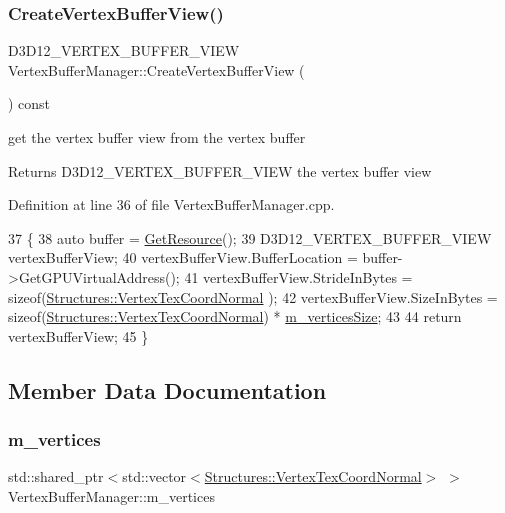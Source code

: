 \subsubsection{\texorpdfstring{Create\+Vertex\+Buffer\+View()}{CreateVertexBufferView()}}
{\footnotesize\ttfamily D3\+D12\+\_\+\+V\+E\+R\+T\+E\+X\+\_\+\+B\+U\+F\+F\+E\+R\+\_\+\+V\+I\+EW Vertex\+Buffer\+Manager\+::\+Create\+Vertex\+Buffer\+View (\begin{DoxyParamCaption}{ }\end{DoxyParamCaption}) const}



get the vertex buffer view from the vertex buffer 

\begin{DoxyReturn}{Returns}
D3\+D12\+\_\+\+V\+E\+R\+T\+E\+X\+\_\+\+B\+U\+F\+F\+E\+R\+\_\+\+V\+I\+EW the vertex buffer view 
\end{DoxyReturn}


Definition at line 36 of file Vertex\+Buffer\+Manager.\+cpp.


\begin{DoxyCode}
37 \{
38     \textcolor{keyword}{auto} buffer = \mbox{\hyperlink{class_buffer_manager_base_afa03f652ef76e70618f7f112b7da48c5}{GetResource}}();
39     D3D12\_VERTEX\_BUFFER\_VIEW vertexBufferView;
40     vertexBufferView.BufferLocation = buffer->GetGPUVirtualAddress();
41     vertexBufferView.StrideInBytes = \textcolor{keyword}{sizeof}(\mbox{\hyperlink{struct_structures_1_1_vertex_tex_coord_normal}{Structures::VertexTexCoordNormal}}
      );
42     vertexBufferView.SizeInBytes = \textcolor{keyword}{sizeof}(\mbox{\hyperlink{struct_structures_1_1_vertex_tex_coord_normal}{Structures::VertexTexCoordNormal}})
       * \mbox{\hyperlink{class_vertex_buffer_manager_a9d499437ec6b54fd97f27a106b0d424a}{m\_verticesSize}};
43 
44     \textcolor{keywordflow}{return} vertexBufferView;
45 \}
\end{DoxyCode}


\subsection{Member Data Documentation}
\mbox{\label{class_vertex_buffer_manager_adbeb6371c5b6dbd5f2adb57273ee342a}} 
\subsubsection{\texorpdfstring{m\+\_\+vertices}{m\_vertices}}
{\footnotesize\ttfamily std\+::shared\+\_\+ptr$<$std\+::vector$<$\mbox{\hyperlink{struct_structures_1_1_vertex_tex_coord_normal}{Structures\+::\+Vertex\+Tex\+Coord\+Normal}}$>$ $>$ Vertex\+Buffer\+Manager\+::m\+\_\+vertices\hspace{0.3cm}{\ttfamily [private]}}



